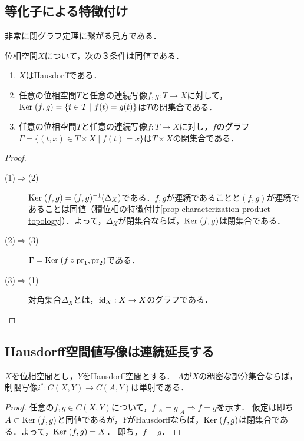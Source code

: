 \documentclass[uplatex,dvipdfmx]{jsreport}
\begin{document}
\subsection{等化子による特徴付け}

\begin{tcolorbox}[colframe=ForestGreen, colback=ForestGreen!10!white,breakable,colbacktitle=ForestGreen!40!white,coltitle=black,fonttitle=\bfseries\sffamily,
title=]
    非常に閉グラフ定理に繋がる見方である．
\end{tcolorbox}

\begin{proposition}\label{prop-characterization-of-Hausdorff-in-terms-of-equalizer}
    位相空間$X$について，次の３条件は同値である．
    \begin{enumerate}
        \item $X$はHausdorffである．
        \item 任意の位相空間$T$と任意の連続写像$f,g:T\to X$に対して，$\mathrm{Ker}\;(f,g)=\{t\in T\mid f(t)=g(t)\}$は$T$の閉集合である．
        \item 任意の位相空間$T$と任意の連続写像$f:T\to X$に対し，$f$のグラフ$\Gamma=\{(t,x)\in T\times X\mid f(t)=x\}$は$T\times X$の閉集合である．
    \end{enumerate}
\end{proposition}
\begin{proof}\mbox{}
    \begin{description}
        \item[(1)$\Rightarrow$(2)] 
        $\mathrm{Ker}\;(f,g)=(f,g)^{-1}(\Delta_X)$である．$f,g$が連続であることと$(f,g)$が連続であることは同値（積位相の特徴付け\ref{prop-characterization-product-topology}）．よって，$\Delta_X$が閉集合ならば，$\mathrm{Ker}\;(f,g)$は閉集合である．
        \item[(2)$\Rightarrow$(3)] 
        $\Gamma=\mathrm{Ker}\;(f\circ\mathrm{pr}_1,\mathrm{pr}_2)$である．
        \item[(3)$\Rightarrow$(1)] 
        対角集合$\Delta_X$とは，$\mathrm{id}_X:X\to X$のグラフである．
    \end{description}
\end{proof}

\subsection{Hausdorff空間値写像は連続延長する}

\begin{corollary}\label{cor-Hausdorff空間への連続写像は，稠密な部分集合への制限で一意的に定まる}
    $X$を位相空間とし，$Y$をHausdorff空間とする．
    $A$が$X$の稠密な部分集合ならば，制限写像$i^*:C(X,Y)\to C(A,Y)$は単射である．
\end{corollary}
\begin{proof}
    任意の$f,g\in C(X,Y)$について，$f|_A=g|_A\Rightarrow f=g$を示す．
    仮定は即ち$A\subset\mathrm{Ker}\;(f,g)$と同値であるが，$Y$がHausdorffならば，$\mathrm{Ker}\;(f,g)$は閉集合である．よって，$\mathrm{Ker}\;(f,g)=X$．
    即ち，$f=g$．
\end{proof}
\end{document}
